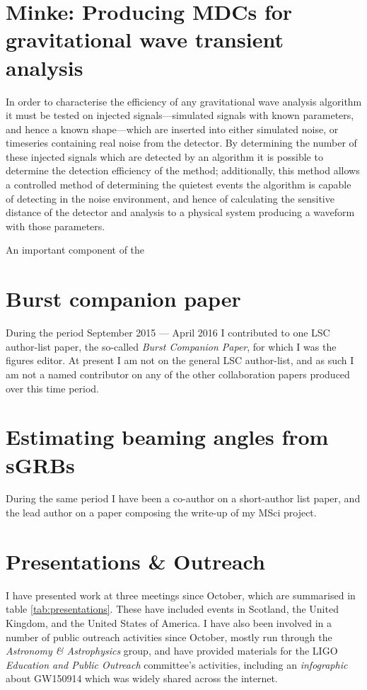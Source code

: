 \documentclass{kentigern}
\begin{document}
\section{Minke: Producing MDCs for gravitational wave transient analysis}
\label{sec:mink-prod-mdcs}

In order to characterise the efficiency of any gravitational wave
analysis algorithm it must be tested on injected signals---simulated
signals with known parameters, and hence a known shape---which are
inserted into either simulated noise, or timeseries containing real
noise from the detector. By determining the number of these injected
signals which are detected by an algorithm it is possible to determine
the detection efficiency of the method; additionally, this method
allows a controlled method of determining the quietest events the
algorithm is capable of detecting in the noise environment, and hence
of calculating the sensitive distance of the detector and analysis to
a physical system producing a waveform with those parameters.

An important component of the 


\section{Burst companion paper}
\label{sec:burst-comp-paper}

During the period September 2015 --- April 2016 I contributed to one
LSC author-list paper, the so-called \emph{Burst Companion Paper}, for
which I was the figures editor. At present I am not on the general LSC
author-list, and as such I am not a named contributor on any of the
other collaboration papers produced over this time period.

\section{Estimating beaming angles from sGRBs}
\label{sec:estim-beam-angl}

During the same period I have been a co-author on a short-author list
paper, and the lead author on a paper composing the write-up of my
MSci project.

\section{Presentations \& Outreach}
\label{sec:pres--outr}

I have presented work at three meetings since October, which are
summarised in table \ref{tab:presentations}. These have included
events in Scotland, the United Kingdom, and the United States of
America. I have also been involved in a number of public outreach
activities since October, mostly run through the \emph{Astronomy \&
  Astrophysics} group, and have provided materials for the LIGO
\emph{Education and Public Outreach} committee's activities, including
an \emph{infographic} about GW150914 which was widely shared across
the internet.
\end{document}
